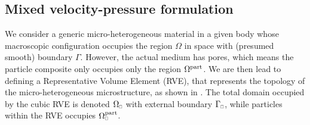 \documentclass[MikaelDissertation.tex]{subfiles}
\begin{document}
\subsection{Mixed velocity-pressure formulation}
We consider a generic micro-heterogeneous material in a given body whose macroscopic configuration occupies the region $\Omega$ in space with (presumed smooth) boundary $\Gamma$.
However, the actual medium has pores, which means the particle composite only occupies only the region $\Omega^{\mathrm{part}}$.
We are then lead to defining a Representative Volume Element (RVE), that represents the topology of the micro-heterogeneous microstructure, as shown in .
The total domain occupied by the cubic RVE is denoted $\Omega_\rve$ with external boundary $\Gamma_\rve$, while particles within the RVE occupies $\Omega_\rve^\particle$.
\end{document}
